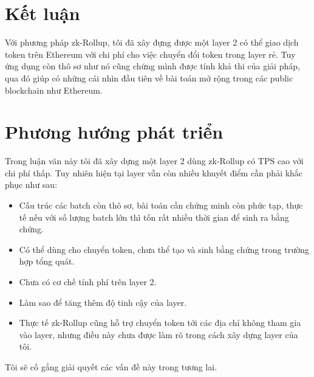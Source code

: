 \documentclass[../thesis.tex]{subfiles}
\begin{document}
\section{Kết luận}
Với phương pháp zk-Rollup, tôi đã xây đựng được một layer 2 có thể giao dịch token trên Ethereum với chi phí cho việc chuyển đổi token trong layer rẻ. Tuy ứng dụng còn thô sơ như nó cũng chứng mình được tính khả thi của giải pháp, qua đó giúp có những cái nhìn đầu tiên về bài toán mở rộng trong các public blockchain như Ethereum.

\section{Phương hướng phát triển}

Trong luận văn này tôi đã xây dựng một layer 2 dùng zk-Rollup có TPS cao với chi phí thấp. Tuy nhiên hiện tại layer vẫn còn nhiều khuyết điểm cần phải khắc phục như sau:
\begin{itemize}
\item Cấu trúc các batch còn thô sơ, bài toán cần chứng minh còn phức tạp, thực tế nếu với số lượng batch lớn thì tốn rất nhiều thời gian để sinh ra bằng chứng.
\item Có thể dùng cho chuyển token, chưa thể tạo và sinh bằng chứng trong trường hợp tổng quát.
\item Chưa có cơ chế tính phí trên layer 2.
\item Làm sao để tăng thêm độ tinh cậy của layer.
\item Thực tế zk-Rollup cũng hỗ trợ chuyển token tới các địa chỉ không tham gia vào layer, nhưng điều này chưa được làm rõ trong cách xây dựng layer của tôi.
\end{itemize}

Tôi sẽ cố gắng giải quyết các vấn đề này trong tương lai.
\end{document}

